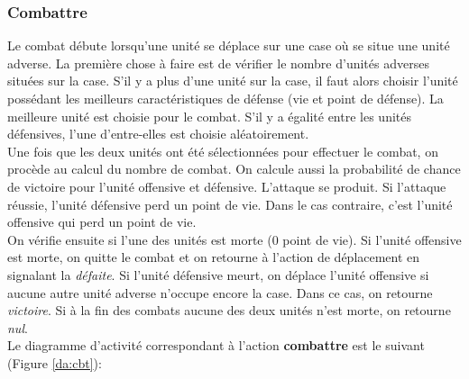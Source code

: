 \documentclass[a4paper,11pt]{article}
\begin{document}
\subsubsection{Combattre}
Le combat débute lorsqu'une unité se déplace sur une case où se situe une unité adverse. La première chose à faire est de vérifier le nombre d'unités adverses situées sur la case. S'il y a plus d'une unité sur la case, il faut alors choisir l'unité possédant les meilleurs caractéristiques de défense (vie et point de défense). La meilleure unité est choisie pour le combat. S'il y a égalité entre les unités défensives, l'une d'entre-elles est choisie aléatoirement.\\ 
\label{subsub:cbt}
Une fois que les deux unités ont été sélectionnées pour effectuer le combat, on procède au calcul du nombre de combat. On calcule aussi la probabilité de chance de victoire pour l'unité offensive et défensive. L'attaque se produit. Si l'attaque réussie, l'unité défensive perd un point de vie. Dans le cas contraire, c'est l'unité offensive qui perd un point de vie.\\ 
On vérifie ensuite si l'une des unités est morte (0 point de vie). Si l'unité offensive est morte, on quitte le combat et on retourne à l'action de déplacement en signalant la \textit{défaite}. Si l'unité défensive meurt, on déplace l'unité offensive si aucune autre unité adverse n'occupe encore la case. Dans ce cas, on retourne \textit{victoire}. Si à la fin des combats aucune des deux unités n'est morte, on retourne \textit{nul}.\\
Le diagramme d'activité correspondant à l'action \textbf{combattre} est le suivant (Figure \ref{da:cbt}):
\end{document}
